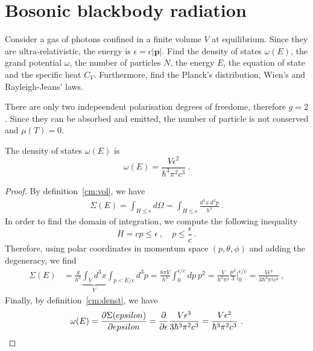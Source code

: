 \section{Bosonic blackbody radiation}

    \begin{exercise}
        Consider a gas of photons confined in a finite volume $V$ at equilibrium. Since they are ultra-relativistic, the energy is $\epsilon = c |\mathbf p|$. 
        Find the density of states $\omega(E)$, the grand potential $\omega$, the number of particles $N$, the energy $E$, the equation of state and the specific heat $C_V$. Furthermore, find the Planck's distribution, Wien's and Rayleigh-Jeans' laws.
    \end{exercise}

    There are only two indepeendent polarisation degrees of freedome, therefore $g=2$. Since they can be absorbed and emitted, the number of particle is not conserved and $\mu (T) = 0$. 

    The density of states $\omega(E)$ is 
    \begin{equation*}
        \omega(E) = \frac{V \epsilon^2}{\hbar^3 \pi^2 c^3} ~.
    \end{equation*}
    \begin{proof}
        By definition~\eqref{cm:vol}, we have
        \begin{equation*}
        \begin{aligned}
            \Sigma (E) = \int_{H \leq \epsilon} d\Omega = \int_{H \leq \epsilon} \frac{d^3 x ~ d^3 p}{h^3} ~.
        \end{aligned}
        \end{equation*}
        In order to find the domain of integration, we compute the following inequality
        \begin{equation*}
            H = c p \leq \epsilon ~, \quad p \leq \frac{\epsilon}{c} ~.
        \end{equation*}
        Therefore, using polar coordinates in momentum space $(p, \theta, \phi)$ and adding the degeneracy, we find
        \begin{equation*}
        \begin{aligned}
            \Sigma (E) & = \frac{g}{h^3} \underbrace{\int_V d^3 x}_V \int_{p < E/c} d^3 p = \frac{8 \pi V}{h^3} \int_0^{\epsilon/c} dp ~p^2 = \frac{V}{\hbar^3 \pi^2} \frac{p^3}{3} \Big \vert_0^{\epsilon/c} = \frac{V \epsilon^3}{3 \hbar^3 \pi^2 c^3}~,
        \end{aligned}
        \end{equation*}
        Finally, by definition~\eqref{cm:denst}, we have
        \begin{equation*}
            \omega (E) = \frac{\partial\Sigma (epsilon)}{\partial epsilon} = \frac{\partial}{\partial\epsilon} \frac{V \epsilon^3}{3 \hbar^3 \pi^2 c^3} = \frac{V \epsilon^2}{\hbar^3 \pi^2 c^3} ~.
        \end{equation*}
    \end{proof}

